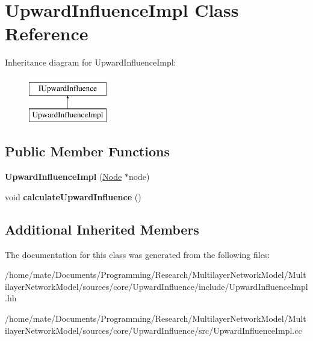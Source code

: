\hypertarget{classUpwardInfluenceImpl}{}\section{Upward\+Influence\+Impl Class Reference}
\label{classUpwardInfluenceImpl}
Inheritance diagram for Upward\+Influence\+Impl\+:\begin{figure}[H]
\begin{center}
\leavevmode
\includegraphics[height=2.000000cm]{classUpwardInfluenceImpl}
\end{center}
\end{figure}
\subsection*{Public Member Functions}
\begin{DoxyCompactItemize}
\item 
{\bfseries Upward\+Influence\+Impl} (\hyperlink{classNode}{Node} $\ast$node)\hypertarget{classUpwardInfluenceImpl_a33c1dc6e1d3cd99e7fab6c9cbc797fcf}{}\label{classUpwardInfluenceImpl_a33c1dc6e1d3cd99e7fab6c9cbc797fcf}

\item 
void {\bfseries calculate\+Upward\+Influence} ()\hypertarget{classUpwardInfluenceImpl_a30b4639db2644244553b54300f84a12c}{}\label{classUpwardInfluenceImpl_a30b4639db2644244553b54300f84a12c}

\end{DoxyCompactItemize}
\subsection*{Additional Inherited Members}


The documentation for this class was generated from the following files\+:\begin{DoxyCompactItemize}
\item 
/home/mate/\+Documents/\+Programming/\+Research/\+Multilayer\+Network\+Model/\+Multilayer\+Network\+Model/sources/core/\+Upward\+Influence/include/Upward\+Influence\+Impl.\+hh\item 
/home/mate/\+Documents/\+Programming/\+Research/\+Multilayer\+Network\+Model/\+Multilayer\+Network\+Model/sources/core/\+Upward\+Influence/src/Upward\+Influence\+Impl.\+cc\end{DoxyCompactItemize}
